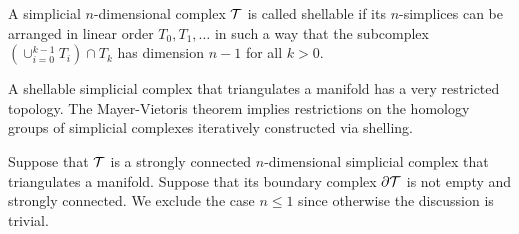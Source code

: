\documentclass[a4paper]{amsart}
\begin{document}
A simplicial $n$-dimensional complex ${\mathcal T}$ is called shellable if its $n$-simplices can be arranged in linear order $T_0, T_1, \dots$ in such a way that the subcomplex $( \cup_{i=0}^{k-1} T_i ) \cap T_k$ has dimension $n-1$ for all $k > 0$.


\begin{remark}
    A shellable simplicial complex that triangulates a manifold has a very restricted topology. 
    The Mayer-Vietoris theorem implies restrictions on the homology groups of simplicial complexes iteratively constructed via shelling. 

    Suppose that ${\mathcal T}$ is a strongly connected $n$-dimensional simplicial complex that triangulates a manifold.
    Suppose that its boundary complex $\partial{\mathcal T}$ is not empty and strongly connected.  
    We exclude the case $n \leq 1$ since otherwise the discussion is trivial.
    

\end{remark}
\end{document}
